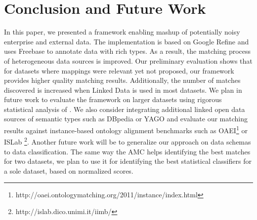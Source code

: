 \documentclass{sig-alternate}
\begin{document}
\section{Conclusion and Future Work}
In this paper, we presented a framework enabling mashup of potentially noisy enterprise and external data. The implementation is based on Google Refine and uses Freebase to annotate data with rich types. As a result, the matching process of heterogeneous data sources is improved. Our preliminary evaluation shows that for datasets where mappings were relevant yet not proposed, our framework provides higher quality matching results. Additionally, the number of matches discovered is increased when Linked Data is used in most datasets. We plan in future work to evaluate the framework on larger datasets using rigorous statistical analysis of \cite{Fawcett}. We also consider integrating additional linked open data sources of semantic types such as DBpedia \cite{Auer07dbpedia:a} or YAGO \cite{Suchanek:2007:YCS:1242572.1242667} and evaluate our matching results against instance-based ontology alignment benchmarks such as OAEI\footnote{http://oaei.ontologymatching.org/2011/instance/index.html} or ISLab \footnote{http://islab.dico.unimi.it/iimb/}. Another future work will be to generalize our approach on data schemas to data classification. The same way the AMC helps identifying the best matches for two datasets, we plan to use it for identifying the best statistical classifiers for a sole dataset, based on normalized scores.

\nocite{*}


\end{document}
